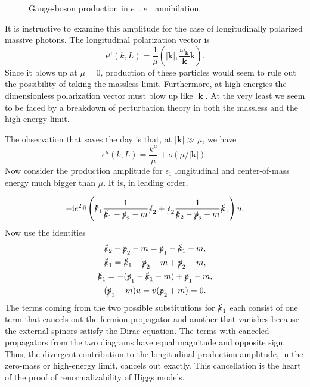 \begin{figure}[htbp]
  \centering
  
  \caption{Gauge-boson production in $e^+,e^-$ annihilation.}
  \label{fig:6.1}
\end{figure}

It is instructive to examine this amplitude for the case of longitudinally polarized
massive photons. The longitudinal polarization vector is
\begin{equation*}
  \epsilon^\mu(k,L)=\frac{1}{\mu}\left(|\mathbf{k}|,\frac{\omega_{\mathbf k}}{|\mathbf{k}|}\mathbf{k}\right).
\end{equation*}
Since it blows up at $\mu=0$, production of these particles would seem to rule out the
possibility of taking the massless limit. Furthermore, at high energies the dimensionless
polarization vector must blow up like $|\mathbf{k}|$. At the very least we seem to be faced by a
breakdown of perturbation theory in both the massless and the high-energy limit.

The observation that saves the day is that, at $|\mathbf{k}|\gg\mu$, we have
\begin{equation*}
  \epsilon^\mu(k,L)=\frac{k^\mu}{\mu}+o(\mu/|\mathbf{k}|).
\end{equation*}
Now consider the production amplitude for $\epsilon_1$ longitudinal and center-of-mass energy
much bigger than $\mu$. It is, in leading order,

\begin{equation}
  -\mathrm{i} e^2\bar v\left(
  \slashed k_1\frac{1}{\slashed k_1-\slashed p_2-m}\slashed\epsilon_2
  +\slashed\epsilon_2\frac{1}{\slashed k_2-\slashed p_2-m}\slashed k_1
  \right)u.
  \label{eq:6.5}
\end{equation}
Now use the identities
\begin{equation*}
  \begin{gathered}
  \slashed k_2-\slashed p_2-m=\slashed p_1-\slashed k_1-m,\\
  \slashed k_1=\slashed k_1-\slashed p_2-m+\slashed p_2+m,\\
  \slashed k_1=-(\slashed p_1-\slashed k_1-m)+\slashed p_1-m,\\
  (\slashed p_1-m)u=\bar v(\slashed p_2+m)=0.
  \end{gathered}
\end{equation*}
The terms coming from the two possible substitutions for $\slashed k_1$ each consist of one term
that cancels out the fermion propagator and another that vanishes because the external
spinors satisfy the Dirac equation. The terms with canceled propagators from the two
diagrams have equal magnitude and opposite sign. Thus, the divergent contribution to
the longitudinal production amplitude, in the zero-mass or high-energy limit, cancels
out exactly. This cancellation is the heart of the proof of renormalizability of Higgs
models.
